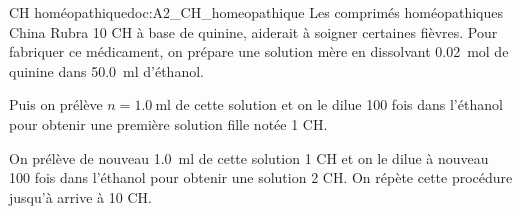 \begin{doc}{CH homéopathique}{doc:A2_CH_homeopathique}
  Les comprimés homéopathiques \og China Rubra 10 CH \fg à base de quinine, aiderait à soigner certaines fièvres.
  Pour fabriquer ce médicament, on prépare une solution mère en dissolvant \qty{0,02}{\mole} de quinine %
  dans \qty{50,0}{\ml} d’éthanol.
  
  Puis on prélève $n = \qty{1,0}{\ml}$ de cette solution et on le dilue 100 fois dans l’éthanol pour obtenir une première solution fille notée 1 CH.
  
  On prélève de nouveau \qty{1,0}{\ml} de cette solution 1 CH et on le dilue à nouveau 100 fois dans l'éthanol pour obtenir une solution 2 CH.
  On répète cette procédure jusqu'à arrive à 10 CH.
\end{doc}



